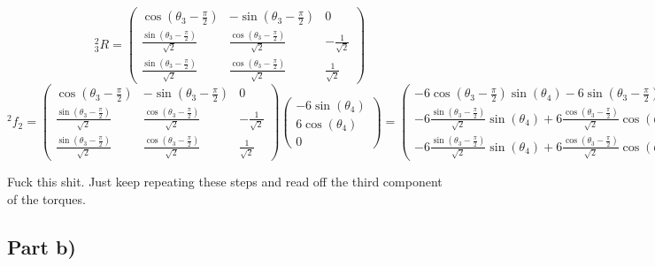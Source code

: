 \documentclass[10pt,a4paper]{article}
\begin{document}
\begin{equation*}
  {}_{3}^{2}R = \begin{pmatrix}
    \cos\left( \theta_{3} - \frac{\pi}{2} \right) & -\sin\left( \theta_{3} - \frac{\pi}{2} \right) & 0\\
    \frac{\sin\left( \theta_{3} - \frac{\pi}{2} \right)}{\sqrt{2}} & \frac{\cos\left( \theta_{3} - \frac{\pi}{2} \right)}{\sqrt{2}} & -\frac{1}{\sqrt{2}}\\
    \frac{\sin\left( \theta_{3} - \frac{\pi}{2} \right)}{\sqrt{2}} & \frac{\cos\left( \theta_{3} - \frac{\pi}{2} \right)}{\sqrt{2}} & \frac{1}{\sqrt{2}}
  \end{pmatrix}
\end{equation*}
\begin{equation*}
  {}^{2}f_{2} = \begin{pmatrix}
    \cos\left( \theta_{3} - \frac{\pi}{2} \right) & -\sin\left( \theta_{3} - \frac{\pi}{2} \right) & 0\\
    \frac{\sin\left( \theta_{3} - \frac{\pi}{2} \right)}{\sqrt{2}} & \frac{\cos\left( \theta_{3} - \frac{\pi}{2} \right)}{\sqrt{2}} & -\frac{1}{\sqrt{2}}\\
    \frac{\sin\left( \theta_{3} - \frac{\pi}{2} \right)}{\sqrt{2}} & \frac{\cos\left( \theta_{3} - \frac{\pi}{2} \right)}{\sqrt{2}} & \frac{1}{\sqrt{2}}
  \end{pmatrix} \begin{pmatrix}
    -6\sin(\theta_{4})\\
    6\cos(\theta_{4})\\
    0
  \end{pmatrix} = \begin{pmatrix}
    -6\cos\left( \theta_{3} - \frac{\pi}{2} \right)\sin(\theta_{4}) - 6\sin\left( \theta_{3} - \frac{\pi}{2} \right)\cos(\theta_{4})\\
    -6\frac{\sin\left( \theta_{3} - \frac{\pi}{2} \right)}{\sqrt{2}}\sin(\theta_{4}) + 6\frac{\cos\left( \theta_{3} - \frac{\pi}{2} \right)}{\sqrt{2}}\cos(\theta_{4})\\
    -6\frac{\sin\left( \theta_{3} - \frac{\pi}{2} \right)}{\sqrt{2}}\sin(\theta_{4}) + 6\frac{\cos\left( \theta_{3} - \frac{\pi}{2} \right)}{\sqrt{2}}\cos(\theta_{4})
  \end{pmatrix}
\end{equation*}

Fuck this shit.
Just keep repeating these steps and read off the third component of the torques.

\subsection*{Part b)}
\end{document}
